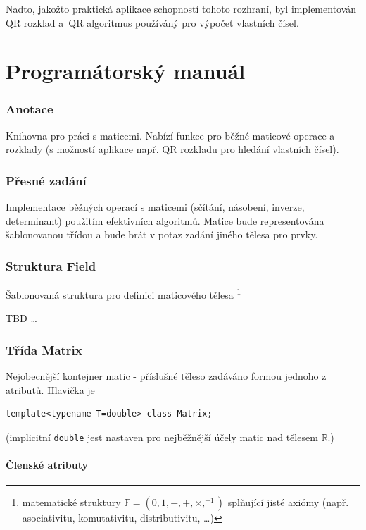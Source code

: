 \documentclass[11pt,a4paper]{article}
\newcommand{\R}{\mathbb{R}}
\begin{document}
Nadto, jakožto praktická aplikace schopností tohoto rozhraní, byl implementován
QR rozklad a~QR algoritmus používáný pro výpočet vlastních čísel.

\pagebreak

\part{Programátorský manuál}
\section{Anotace}
Knihovna pro práci s maticemi.
Nabízí funkce pro běžné maticové operace a rozklady (s možností aplikace např.
QR rozkladu pro hledání vlastních čísel).

\section{Přesné zadání}
Implementace běžných operací s maticemi (sčítání, násobení, inverze,
determinant) použitím efektivních algoritmů. 
Matice bude representována šablonovanou třídou a bude brát v potaz zadání
jiného tělesa pro prvky.

\section{Struktura Field}

Šablonovaná struktura pro definici maticového tělesa\thinspace%
\footnote{matematické struktury $\mathbb{F} = (0, 1, -, +, \times, ^{-1})$
splňující jisté axiómy (např. asociativitu, komutativitu, distributivitu,
\ldots)}

TBD \ldots

\section{Třída Matrix}

Nejobecnější kontejner matic - příslušné těleso zadáváno formou jednoho z
atributů.
Hlavička je
\begin{verbatim}
template<typename T=double> class Matrix;
\end{verbatim}
(implicitní \verb=double= jest nastaven pro nejběžnější účely matic nad tělesem
$\R$.)

\renewcommand{\labelitemi}{$\heartsuit$}
\renewcommand{\labelitemii}{$\spadesuit$}
\renewcommand{\labelitemiii}{$\clubsuit$}

\subsection{Členské atributy}
\end{document}
